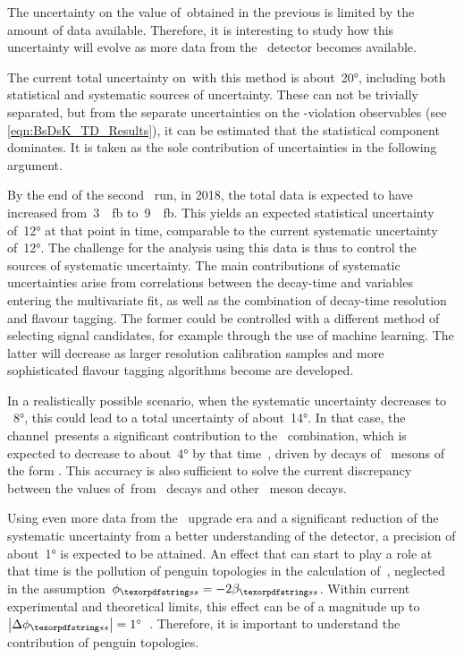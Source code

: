 The uncertainty on the value of~\CPgamma obtained in the previous  is limited by the amount of data available.
Therefore, it is interesting to study how this uncertainty will evolve as more data from the \lhcb~detector becomes available.

The current total uncertainty on~\CPgamma with this method is about~\ang{20}, including both statistical and systematic sources of uncertainty.
These can not be trivially separated, but from the separate uncertainties on the \CP-violation observables (see \cref{eqn:BsDsK_TD_Results}), it can be estimated that the statistical component dominates.
It is taken as the sole contribution of uncertainties in the following argument.

By the end of the second \lhc~run, in 2018, the total data is expected to have increased from~\SI{3}{\per\femto\barn} to~\SI{9}{\per\femto\barn}.
This yields an expected statistical uncertainty of~\ang{12} at that point in time, comparable to the current systematic uncertainty of~\ang{12}.
The challenge for the analysis using this data is thus to control the sources of systematic uncertainty.
The main contributions of systematic uncertainties arise from correlations between the decay-time and variables entering the multivariate fit, as well as the combination of decay-time resolution and flavour tagging.
The former could be controlled with a different method of selecting signal candidates, for example through the use of machine learning.
The latter will decrease as larger resolution calibration samples and more sophisticated flavour tagging algorithms become are developed.

In a realistically possible scenario, when the systematic uncertainty decreases to \eg~\ang{8}, this could lead to a total uncertainty of about~\ang{14}.
In that case, the channel~\BsDsK presents a significant contribution to the \CPgamma~combination, which is expected to decrease to about~\ang{4} by that time~\cite{LHCb-PAPER-2016-032}, driven by decays of \Bpm~mesons of the form \decay{\Bpm}{\Dz\Kpm}.
This accuracy is also sufficient to solve the current discrepancy between the values of~\CPgamma from \BsDsK~decays and other \bquark~meson decays.

Using even more data from the \lhcb~upgrade era and a significant reduction of the systematic uncertainty from a better understanding of the detector, a precision of about~\ang{1} is expected to be attained.
An effect that can start to play a role at that time is the pollution of penguin topologies in the calculation of~\betas, neglected in the assumption~\({\phis = -2\betas}\).
Within current experimental and theoretical limits, this effect can be of a magnitude up to~\({\abs{\upDelta\phis} = \ang{1}}\)~\cite{VSyropoulos:PhDThesis,DeBruyn:PhDThesis,DeBruyn:2014oga}.
Therefore, it is important to understand the contribution of penguin topologies.


